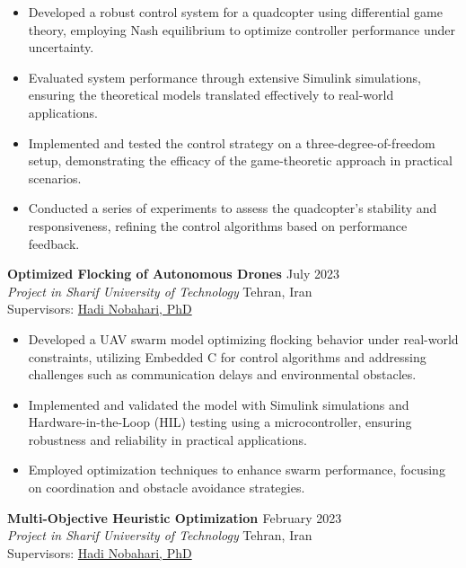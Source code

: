 \documentclass[12pt]{article}
\begin{document}
\begin{itemize} \itemsep -4pt %
    \item Developed a robust control system for a quadcopter using differential game theory, employing Nash equilibrium to optimize controller performance under uncertainty.
    \item Evaluated system performance through extensive Simulink simulations, ensuring the theoretical models translated effectively to real-world applications.
    \item Implemented and tested the control strategy on a three-degree-of-freedom setup, demonstrating the efficacy of the game-theoretic approach in practical scenarios.
    \item Conducted a series of experiments to assess the quadcopter's stability and responsiveness, refining the control algorithms based on performance feedback.
\end{itemize}



\noindent
{\bfseries Optimized Flocking of Autonomous Drones
\href{https://github.com/alibaniasad1999/Guidance-and-navigation}{\faGithub}
} \hfill July 2023 \\ 
\noindent \textit{Project in Sharif University of Technology} \hfill Tehran, Iran \\ 
\noindent Supervisors: 
\href{https://ae.sharif.edu/~portal/faculty/1091235256}{Hadi Nobahari, PhD} 

\begin{itemize} \itemsep -1pt %
    \item Developed a UAV swarm model optimizing flocking behavior under real-world constraints, utilizing Embedded C for control algorithms and addressing challenges such as communication delays and environmental obstacles.
    \item Implemented and validated the model with Simulink simulations and Hardware-in-the-Loop (HIL) testing using a microcontroller, ensuring robustness and reliability in practical applications.
    \item Employed optimization techniques to enhance swarm performance, focusing on coordination and obstacle avoidance strategies.
\end{itemize}


\noindent
{\bfseries Multi-Objective Heuristic Optimization
\href{https://github.com/alibaniasad1999/Heuristic-optimization-algorithms}{\faGithub}
}
\hfill February 2023 \\ 
\noindent \textit{Project in Sharif University of Technology} \hfill Tehran, Iran \\
\noindent Supervisors: 
\href{https://ae.sharif.edu/~portal/faculty/1091235256}{Hadi Nobahari, PhD} 
\end{document}

